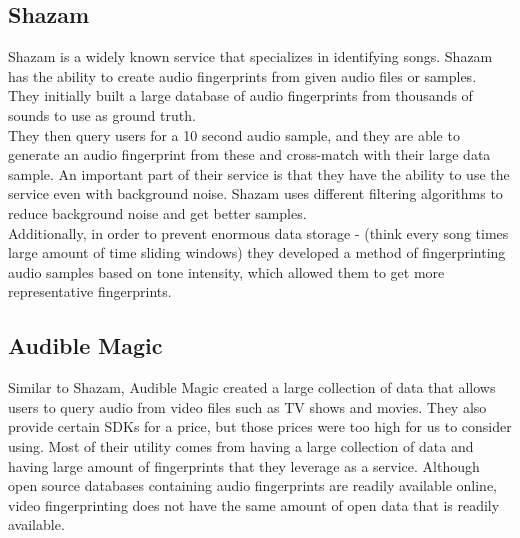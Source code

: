 \documentclass[paper=a4, fontsize=11pt]{scrartcl} %
\numberwithin{equation}{section} %
\numberwithin{figure}{section} %
\numberwithin{table}{section} %
\begin{document}
\subsection{Shazam}
\label{sec:shazam}

Shazam is a widely known service that specializes in identifying songs. Shazam has the ability to create audio fingerprints from given audio files or samples. They initially built a large database of audio fingerprints from thousands of sounds to use as ground truth. \\

They then query users for a 10 second audio sample, and they are able to generate an audio fingerprint from these and cross-match with their large data sample. An important part of their service is that they have the ability to use the service even with background noise. Shazam uses different filtering algorithms to reduce background noise and get better samples. \\

Additionally, in order to prevent enormous data storage - (think every song times large amount of time sliding windows) they developed a method of fingerprinting audio samples based on tone intensity, which allowed them to get more representative fingerprints.

\subsection{Audible Magic}
\label{sec:audible-magic}

Similar to Shazam, Audible Magic created a large collection of data that allows users to query audio from video files such as TV shows and movies. They also provide certain SDKs for a price, but those prices were too high for us to consider using. Most of their utility comes from having a large collection of data and having large amount of fingerprints that they leverage as a service. Although open source databases containing audio fingerprints are readily available online, video fingerprinting does not have the same amount of open data that is readily available.
\end{document}
